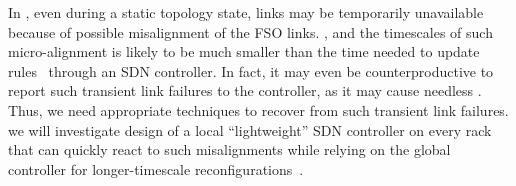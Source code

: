  In \ArchName, even during
a static topology state, links may be temporarily unavailable because
of possible misalignment of the FSO links. , and the timescales of such
  micro-alignment is likely to be much smaller than the time needed to
  update rules~\cite{ddcnsdi13} through an SDN controller. In fact, it
  may even be counterproductive to report such transient link failures
  to the controller, as it may cause needless . Thus, we need appropriate
   techniques to recover from such transient link
  failures.  we
  will investigate design of a local ``lightweight'' SDN controller on
  every rack that can quickly react to such misalignments while
  relying on the global controller for longer-timescale
  reconfigurations~\cite{ddc}.
